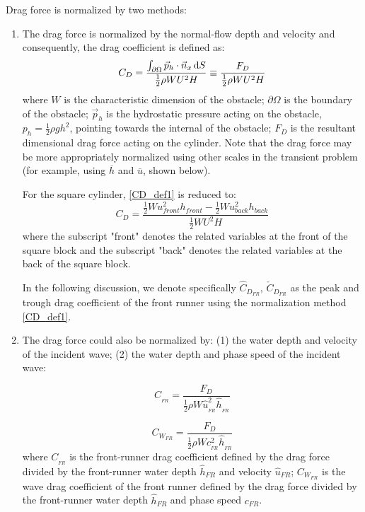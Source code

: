 \documentclass{jfm}
\begin{document}
Drag force is normalized by two methods:

\begin{enumerate}
	\item  The drag force is normalized by the normal-flow depth and velocity and consequently, the drag coefficient is defined as:
\begin{equation}
	C_D=\frac{\int_{\partial \Omega} \vec{p}_h \cdot \vec{n}_x \,{\rm{d}}S }{\frac{1}{2}\rho W U^2 H}\equiv \frac{F_D}{\frac{1}{2}\rho W U^2 H}
	\label{CD_def1}
\end{equation}
where $W$ is the characteristic dimension of the obstacle; $\partial \Omega$ is the boundary of the obstacle; $\vec{p}_h$ is the hydrostatic pressure acting on the obstacle, $p_h=\frac{1}{2}\rho g h^2$, pointing towards the internal of the obstacle; $F_D$ is the resultant dimensional drag force acting on the cylinder. Note that the drag force may be more appropriately normalized using other scales in the transient problem (for example, using $\overline{h}$ and $\overline{u}$, shown below).

For the square cylinder, \autoref{CD_def1} is reduced to:
\begin{equation}
	C_D=\frac{\frac{1}{2} W u_{front}^2 h_{front}- \frac{1}{2} W u_{back}^2 h_{back}}{\frac{1}{2} W U^2 H}
	\label{CD_def_square}
\end{equation}
where the subscript "front" denotes the related variables at the front of the square block and the subscript "back" denotes the related variables at the back of the square block.

In the following discussion, we denote specifically $\hat{C}_{D_{FR}},\, \check{C}_{D_{FR}}$ as the peak and trough drag coefficient of the front runner using the normalization method \autoref{CD_def1}.

	\item The drag force could also be normalized by: (1) the water depth and velocity of the  incident wave; (2) the water depth and phase speed of the  incident wave:

\begin{equation}
	{C} _{_{FR}}=\frac{F_{D}}{\frac{1}{2}\rho W \hat{u}_{_{FR}}^2 \hat{h}_{_{FR}}
	\label{CD_FR_def2}}
\end{equation}

\begin{equation}
	{C} _{W_{FR}}=\frac{F_{D}}{\frac{1}{2}\rho W c_{_{FR}}^2 \hat{h}_{_{FR}}}
	\label{CD_FR_def3}
\end{equation}
where ${C} _{_{FR}}$ is the front-runner drag coefficient defined by the drag force divided by the front-runner water depth $\hat{h}_{FR}$ and velocity $\hat{u}_{FR}$; ${C} _{W_{FR}}$ is the wave drag coefficient of the front runner defined by the drag force divided by the front-runner water depth $\hat{h}_{FR}$ and phase speed ${c}_{FR}$.

\end{enumerate}
\end{document}
